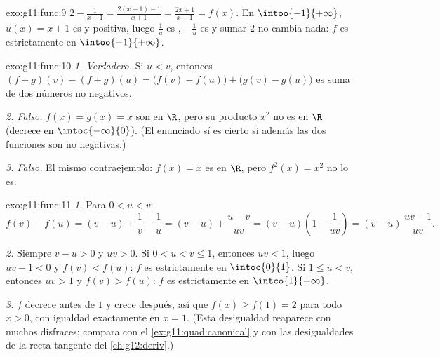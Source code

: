 \begin{solution}{exo:g11:func:9}
$2 - \frac{1}{x+1} = \frac{2(x+1) - 1}{x+1} = \frac{2x+1}{x+1} = f(x)$. En
$\intoo{-1}{+\infty}$, $u(x) = x + 1$ es  y positiva, luego
$\frac1u$ es , $-\frac1u$ es  y sumar $2$ no cambia
nada: $f$ es estrictamente  en $\intoo{-1}{+\infty}$.
\end{solution}

\begin{solution}{exo:g11:func:10}
\emph{1. Verdadero.} Si $u < v$, entonces
$(f+g)(v) - (f+g)(u) = \bigl(f(v)-f(u)\bigr) + \bigl(g(v)-g(u)\bigr)$ es
suma de dos números no negativos.

\emph{2. Falso.} $f(x) = g(x) = x$ son  en $\R$, pero su
producto $x^2$ no es  en $\R$ (decrece en $\intoc{-\infty}{0}$).
(El enunciado sí es cierto si además las dos funciones son no negativas.)

\emph{3. Falso.} El mismo contraejemplo: $f(x) = x$ es  en $\R$,
pero $f^2(x) = x^2$ no lo es.
\end{solution}

\begin{solution}{exo:g11:func:11}
\emph{1.} Para $0 < u < v$:
\[
f(v) - f(u) = (v - u) + \frac1v - \frac1u
= (v - u) + \frac{u - v}{uv}
= (v - u)\left(1 - \frac{1}{uv}\right)
= (v - u)\,\frac{uv - 1}{uv}.
\]

\emph{2.} Siempre $v - u > 0$ y $uv > 0$. Si $0 < u < v \leq 1$, entonces
$uv < 1$, luego $uv - 1 < 0$ y $f(v) < f(u)$: $f$ es estrictamente
 en $\intoc{0}{1}$. Si $1 \leq u < v$, entonces $uv > 1$ y
$f(v) > f(u)$: $f$ es estrictamente  en $\intco{1}{+\infty}$.

\emph{3.} $f$ decrece antes de $1$ y crece después, así que
$f(x) \geq f(1) = 2$ para todo $x > 0$, con igualdad exactamente en
$x = 1$. (Esta desigualdad reaparece con muchos disfraces; compara con el
\cref{ex:g11:quad:canonical} y con las desigualdades de la recta tangente
del \cref{ch:g12:deriv}.)
\end{solution}

